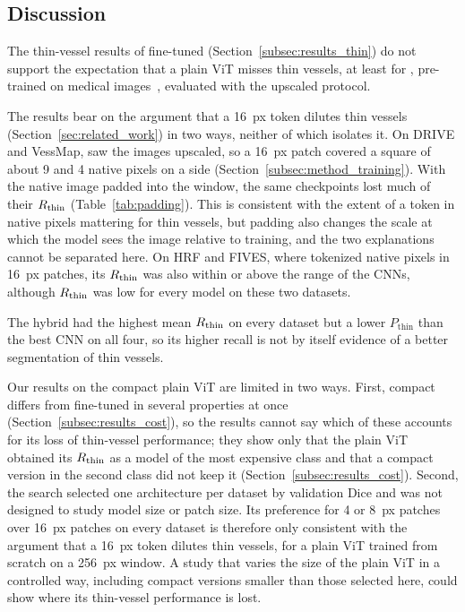\subsection{Discussion}
\label{subsec:discussion}

The thin-vessel results of fine-tuned \medsam{} (Section~\ref{subsec:results_thin}) do not support the expectation that a plain ViT misses thin vessels, at least for \medsam{}, pre-trained on medical images~\cite{ma2024segment}, evaluated with the upscaled protocol.

The results bear on the argument that a 16~px token dilutes thin vessels (Section~\ref{sec:related_work}) in two ways, neither of which isolates it. On DRIVE and VessMap, \medsam{} saw the images upscaled, so a 16~px patch covered a square of about 9 and 4 native pixels on a side (Section~\ref{subsec:method_training}). With the native image padded into the window, the same checkpoints lost much of their $R_{\mathrm{thin}}$ (Table~\ref{tab:padding}). This is consistent with the extent of a token in native pixels mattering for thin vessels, but padding also changes the scale at which the model sees the image relative to training, and the two explanations cannot be separated here. On HRF and FIVES, where \medsam{} tokenized native pixels in 16~px patches, its $R_{\mathrm{thin}}$ was also within or above the range of the CNNs, although $R_{\mathrm{thin}}$ was low for every model on these two datasets.

The hybrid \litemedsam{} had the highest mean $R_{\mathrm{thin}}$ on every dataset but a lower $P_{\mathrm{thin}}$ than the best CNN on all four, so its higher recall is not by itself evidence of a better segmentation of thin vessels.

Our results on the compact plain ViT are limited in two ways. First, compact \medsam{} differs from fine-tuned \medsam{} in several properties at once (Section~\ref{subsec:results_cost}), so the results cannot say which of these accounts for its loss of thin-vessel performance; they show only that the plain ViT obtained its $R_{\mathrm{thin}}$ as a model of the most expensive class and that a compact version in the second class did not keep it (Section~\ref{subsec:results_cost}). Second, the search selected one architecture per dataset by validation Dice and was not designed to study model size or patch size. Its preference for 4 or 8~px patches over 16~px patches on every dataset is therefore only consistent with the argument that a 16~px token dilutes thin vessels, for a plain ViT trained from scratch on a 256~px window. A study that varies the size of the plain ViT in a controlled way, including compact versions smaller than those selected here, could show where its thin-vessel performance is lost.

